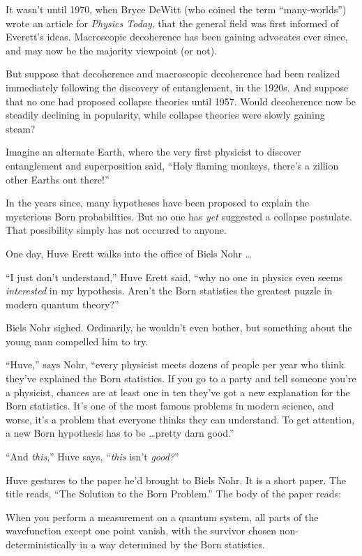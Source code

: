 {
 It wasn't until 1970, when Bryce DeWitt (who
coined the term ``many-worlds'')
wrote an article for \textit{Physics Today}, that the general field was
first informed of Everett's ideas. Macroscopic
decoherence has been gaining advocates ever since, and may now be the
majority viewpoint (or not).}

{
 But suppose that decoherence and macroscopic decoherence had been
realized immediately following the discovery of entanglement, in the
1920s. And suppose that no one had proposed collapse theories until
1957. Would decoherence now be steadily declining in popularity, while
collapse theories were slowly gaining steam?}

{
 Imagine an alternate Earth, where the very first physicist to
discover entanglement and superposition said, ``Holy
flaming monkeys, there's a zillion other Earths out
there!''}

{
 In the years since, many hypotheses have been proposed to explain
the mysterious Born probabilities. But no one has \textit{yet}
suggested a collapse postulate. That possibility simply has not
occurred to anyone.}

{
 One day, Huve Erett walks into the office of Biels Nohr \ldots}

{
 ``I just don't
understand,'' Huve Erett said, ``why
no one in physics even seems \textit{interested} in my hypothesis.
Aren't the Born statistics the greatest puzzle in
modern quantum theory?''}

{
 Biels Nohr sighed. Ordinarily, he wouldn't even
bother, but something about the young man compelled him to try.}

{
 ``Huve,'' says Nohr,
``every physicist meets dozens of people per year who
think they've explained the Born statistics. If you go
to a party and tell someone you're a physicist, chances
are at least one in ten they've got a new explanation
for the Born statistics. It's one of the most famous
problems in modern science, and worse, it's a problem
that everyone thinks they can understand. To get attention, a new Born
hypothesis has to be \ldots pretty darn good.''}

{
 ``And \textit{this},'' Huve
says, ``\textit{this} isn't
\textit{good?}''}

{
 Huve gestures to the paper he'd brought to Biels
Nohr. It is a short paper. The title reads, ``The
Solution to the Born Problem.'' The body of the paper
reads:}

{
 When you perform a measurement on a quantum system, all parts of
the wavefunction except one point vanish, with the survivor chosen
non-deterministically in a way determined by the Born statistics.}

